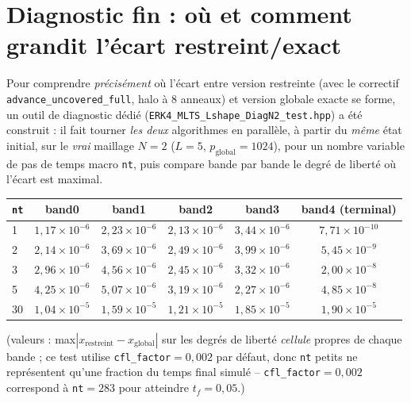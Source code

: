 \documentclass[11pt]{article}
\begin{document}
\section{Diagnostic fin : où et comment grandit l'écart restreint/exact}
\label{sec:diagn2}

Pour comprendre \emph{précisément} où l'écart entre version restreinte
(avec le correctif \texttt{advance\_uncovered\_full}, halo à 8 anneaux)
et version globale exacte se forme, un outil de diagnostic dédié
(\texttt{ERK4\_MLTS\_Lshape\_DiagN2\_test.hpp}) a été construit : il
fait tourner \emph{les deux} algorithmes en parallèle, à partir du
\emph{même} état initial, sur le \emph{vrai} maillage $N=2$ ($L=5$,
$p_{\text{global}}=1024$), pour un nombre variable de pas de temps
macro \texttt{nt}, puis compare bande par bande le degré de liberté où
l'écart est maximal.

\begin{center}
\begin{tabular}{@{}lccccc@{}}
\toprule
\texttt{nt} & band0 & band1 & band2 & band3 & band4 (terminal) \\
\midrule
1  & $1{,}17\times10^{-6}$ & $2{,}23\times10^{-6}$ & $2{,}13\times10^{-6}$ & $3{,}44\times10^{-6}$ & $7{,}71\times10^{-10}$ \\
2  & $2{,}14\times10^{-6}$ & $3{,}69\times10^{-6}$ & $2{,}49\times10^{-6}$ & $3{,}99\times10^{-6}$ & $5{,}45\times10^{-9}$ \\
3  & $2{,}96\times10^{-6}$ & $4{,}56\times10^{-6}$ & $2{,}45\times10^{-6}$ & $3{,}32\times10^{-6}$ & $2{,}00\times10^{-8}$ \\
5  & $4{,}25\times10^{-6}$ & $5{,}07\times10^{-6}$ & $3{,}19\times10^{-6}$ & $2{,}27\times10^{-6}$ & $4{,}85\times10^{-8}$ \\
30 & $1{,}04\times10^{-5}$ & $1{,}59\times10^{-5}$ & $1{,}21\times10^{-5}$ & $1{,}85\times10^{-5}$ & $1{,}90\times10^{-5}$ \\
\bottomrule
\end{tabular}
\end{center}
(valeurs : max$|x_{\text{restreint}} - x_{\text{global}}|$ sur les
degrés de liberté \emph{cellule} propres de chaque bande ; ce test
utilise \texttt{cfl\_factor}$=0{,}002$ par défaut, donc \texttt{nt}
petits ne représentent qu'une fraction du temps final simulé --
\texttt{cfl\_factor}$=0{,}002$ correspond à \texttt{nt}$=283$ pour
atteindre $t_f=0{,}05$.)
\end{document}
